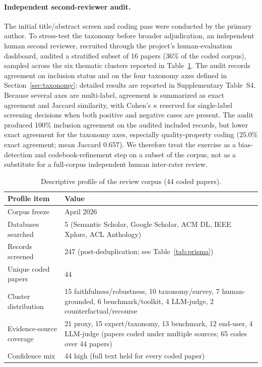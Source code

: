\documentclass[10pt]{article}
\begin{document}
\paragraph{Independent second-reviewer audit.}
The initial title/abstract screen and coding pass were conducted by the
primary author. To stress-test the taxonomy before broader adjudication, an
independent human second reviewer, recruited through the project's
human-evaluation dashboard, audited a stratified subset of 16 papers
(36\% of the coded corpus), sampled across the six thematic clusters
reported in Table~\ref{tab:corpus_profile}. The audit records
agreement on inclusion status and on the four taxonomy axes defined in
Section~\ref{sec:taxonomy}; detailed results are reported in
Supplementary Table~S4. Because several axes are multi-label, agreement
is summarized as exact agreement and Jaccard similarity, with Cohen's
$\kappa$ reserved for single-label screening decisions when both positive
and negative cases are present. The audit produced 100\% inclusion
agreement on the audited included records, but lower exact agreement for
the taxonomy axes, especially quality-property coding (25.0\% exact
agreement; mean Jaccard 0.657). We therefore treat the exercise as a
bias-detection and codebook-refinement step on a subset of the corpus, not
as a substitute for a full-corpus independent human inter-rater review.

\begin{table}[t]
\centering
\caption{Descriptive profile of the review corpus (44 coded papers).}
\begin{tabularx}{\linewidth}{l X}
\toprule
\textbf{Profile item} & \textbf{Value} \\
\midrule
Corpus freeze & April 2026 \\
Databases searched & 5 (Semantic Scholar, Google Scholar, ACM DL, IEEE Xplore, ACL Anthology) \\
Records screened & 247 (post-deduplication; see Table~\ref{tab:prisma}) \\
Unique coded papers & 44 \\
Cluster distribution & 15 faithfulness/robustness, 10 taxonomy/survey, 7 human-grounded, 6 benchmark/toolkit, 4 LLM-judge, 2 counterfactual/recourse \\
Evidence-source coverage & 21 proxy, 15 expert/taxonomy, 13 benchmark, 12 end-user, 4 LLM-judge (papers coded under multiple sources; 65 codes over 44 papers) \\
Confidence mix & 44 high (full text held for every coded paper) \\
\bottomrule
\end{tabularx}
\label{tab:corpus_profile}
\end{table}
\end{document}
